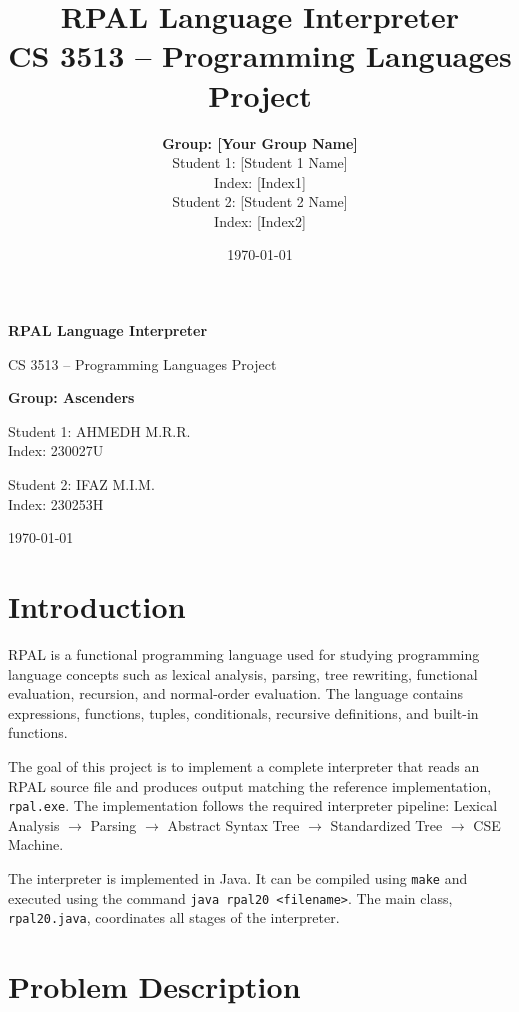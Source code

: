 \documentclass[12pt,a4paper]{article}
\title{
    \textbf{RPAL Language Interpreter}\\
    \large CS 3513 -- Programming Languages Project
}
\author{
    \textbf{Group: [Your Group Name]}\\[0.5cm]
    Student 1: [Student 1 Name] \\
    Index: [Index1]\\[0.3cm]
    Student 2: [Student 2 Name] \\
    Index: [Index2]
}
\date{\today}
\begin{document}
\begin{titlepage}
    \centering
    \vspace*{2cm}
    {\Huge \textbf{RPAL Language Interpreter}\par}
    \vspace{0.5cm}
    {\Large CS 3513 -- Programming Languages Project\par}
    \vspace{1.5cm}
    {\large \textbf{Group: Ascenders}\par}
    \vspace{1.5cm}
    {\large Student 1: AHMEDH M.R.R. \\ Index: 230027U\par}
    \vspace{0.5cm}
    {\large Student 2: IFAZ M.I.M. \\ Index: 230253H\par}
    \vfill
    {\large \today\par}
\end{titlepage}

\newpage
\tableofcontents
\newpage

\section{Introduction}

RPAL is a functional programming language used for studying programming language concepts such as lexical analysis, parsing, tree rewriting, functional evaluation, recursion, and normal-order evaluation. The language contains expressions, functions, tuples, conditionals, recursive definitions, and built-in functions.

The goal of this project is to implement a complete interpreter that reads an RPAL source file and produces output matching the reference implementation, \texttt{rpal.exe}. The implementation follows the required interpreter pipeline: Lexical Analysis $\rightarrow$ Parsing $\rightarrow$ Abstract Syntax Tree $\rightarrow$ Standardized Tree $\rightarrow$ CSE Machine.

The interpreter is implemented in Java. It can be compiled using \texttt{make} and executed using the command \texttt{java rpal20 <filename>}. The main class, \texttt{rpal20.java}, coordinates all stages of the interpreter.

\section{Problem Description}
\end{document}
